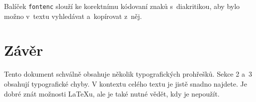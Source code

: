 \documentclass[twocolumn]{article}
\begin{document}
Balíček \texttt{fontenc} slouží ke korektnímu kódovaní znaků s~diakritikou, aby bylo možno v~textu vyhledávat a~kopírovat z~něj.
\section{Závěr}
Tento dokument schválně obsahuje několik typografických prohřešků.
Sekce 2 a~3 obsahují typografické chyby.
V kontextu celého textu je jistě snadno najdete.
Je dobré znát možnosti \LaTeX u, ale je také nutné vědět, kdy je nepoužít.
\end{document}
